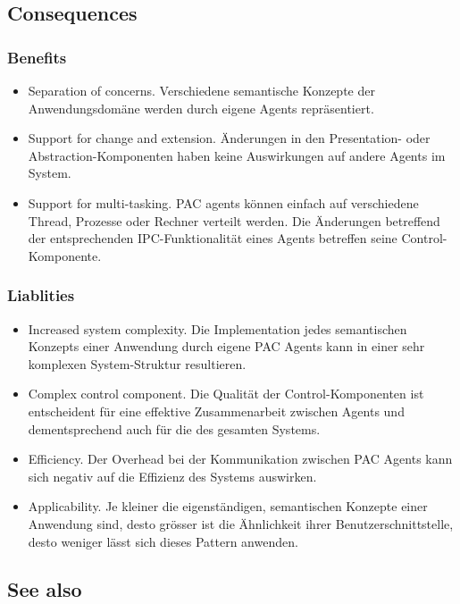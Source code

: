 \subsection*{Consequences}


\subsubsection*{Benefits}


\begin{itemize}
	\item Separation of concerns. Verschiedene semantische Konzepte der Anwendungsdomäne werden durch eigene Agents repräsentiert.
	\item Support for change and extension. Änderungen in den Presentation- oder Abstraction-Komponenten haben keine Auswirkungen auf andere Agents im System.
	\item Support for multi-tasking. PAC agents können einfach auf verschiedene Thread, Prozesse oder Rechner verteilt werden. Die Änderungen betreffend der entsprechenden IPC-Funktionalität eines Agents betreffen seine Control-Komponente.
\end{itemize}

\subsubsection*{Liablities}


\begin{itemize}
	\item Increased system complexity. Die Implementation jedes semantischen Konzepts einer Anwendung durch eigene PAC Agents kann in einer sehr komplexen System-Struktur resultieren.
	\item Complex control component. Die Qualität der Control-Komponenten ist entscheident für eine effektive Zusammenarbeit zwischen Agents und dementsprechend auch für die des gesamten Systems.
	\item Efficiency. Der Overhead bei der Kommunikation zwischen PAC Agents kann sich negativ auf die Effizienz des Systems auswirken.
	\item Applicability. Je kleiner die eigenständigen, semantischen Konzepte einer Anwendung sind, desto grösser ist die Ähnlichkeit ihrer Benutzerschnittstelle, desto weniger lässt sich dieses Pattern anwenden.
\end{itemize}

\subsection*{See also}


